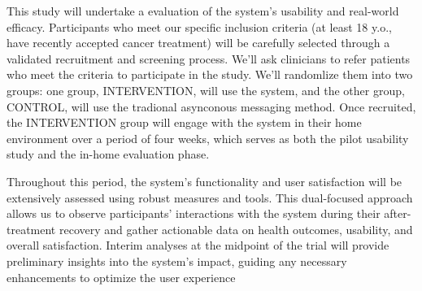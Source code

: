 \documentclass[11pt]{article}
\begin{document}
This study will undertake a evaluation of the system's usability and real-world efficacy. Participants who meet our specific inclusion criteria (at least 18 y.o., have recently accepted cancer treatment) will be carefully selected through a validated recruitment and screening process. 
We'll ask clinicians to refer patients who meet the criteria to participate in the study.
We'll randomlize them into two groups: one group, INTERVENTION, will use the system, and the other group, CONTROL, will use the tradional asynconous messaging method.
Once recruited, the INTERVENTION group will engage with the system in their home environment over a period of four weeks, which serves as both the pilot usability study and the in-home evaluation phase.

Throughout this period, the system's functionality and user satisfaction will be extensively assessed using robust measures and tools. This dual-focused approach allows us to observe participants' interactions with the system during their after-treatment recovery and gather actionable data on health outcomes, usability, and overall satisfaction. Interim analyses at the midpoint of the trial will provide preliminary insights into the system's impact, guiding any necessary enhancements to optimize the user experience

\clearpage
\appendix


\end{document}
